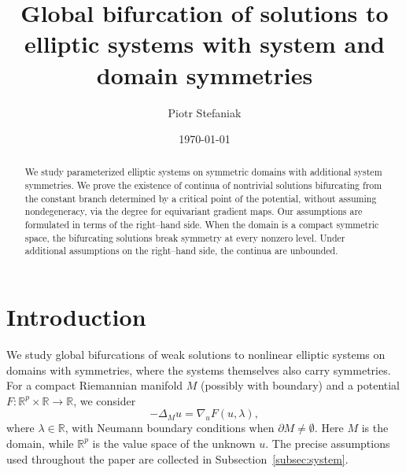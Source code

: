 \documentclass[reqno,twoside,12pt]{amsart}
\newcommand{\bR}{\mathbb{R}}
\numberwithin{equation}{section} \errorcontextlines=0
\begin{document}
\title[Global bifurcation for elliptic systems with symmetries]{Global bifurcation of solutions to elliptic systems with system and domain symmetries}


\author{Piotr Stefaniak}
\address{Faculty of Mathematics and Computer Science \\ Nicolaus Copernicus University in Toru\'n\\
PL-87-100 Toru\'{n} \\ ul. Chopina $12 \slash 18$ \\
Poland}


\date{\today}


\begin{abstract}
We study parameterized elliptic systems on symmetric domains with additional system symmetries. We prove the existence of continua of nontrivial solutions bifurcating from the constant branch determined by a critical point of the potential, without assuming nondegeneracy, via the degree for equivariant gradient maps. Our assumptions are formulated in terms of the right–hand side. When the domain is a compact symmetric space, the bifurcating solutions break symmetry at every nonzero level. Under additional assumptions on the right–hand side, the continua are unbounded.
\end{abstract}





\maketitle


\section{Introduction}
We study global bifurcations of weak solutions to nonlinear elliptic systems on domains with symmetries, where the systems themselves also carry symmetries. For a compact Riemannian manifold $M$ (possibly with boundary) and a potential $F:\bR^{p}\times\bR\to\bR$, we consider
\begin{equation}\label{eq:sys-intr}
-\Delta_{M}u=\nabla_{u}F(u,\lambda),
\end{equation}
where $\lambda\in\bR$, with Neumann boundary conditions when $\partial M\ne\emptyset$. Here $M$ is the domain, while $\bR^p$ is the value space of the unknown $u$. The precise assumptions used throughout the paper are collected in Subsection~\ref{subsec:system}.
\end{document}
